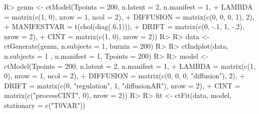\documentclass[nojss]{jss}\usepackage[]{graphicx}\usepackage[]{color}
\begin{document}

\begin{Schunk}
\begin{Sinput}
R> genm <- ctModel(Tpoints = 200, n.latent = 2, n.manifest = 1, 
+   LAMBDA = matrix(c(1, 0), nrow = 1, ncol = 2),
+   DIFFUSION = matrix(c(0, 0, 0, 1), 2),
+   MANIFESTVAR = t(chol(diag(.6,1))),
+   DRIFT = matrix(c(0, -.1, 1, -.2), nrow = 2),   
+   CINT = matrix(c(1, 0), nrow = 2))
R> 
R> data <- ctGenerate(genm, n.subjects = 1, burnin = 200)
R> 
R> ctIndplot(data, n.subjects = 1 , n.manifest = 1, Tpoints = 200)
R> 
R> model <- ctModel(Tpoints = 200, n.latent = 2, n.manifest = 1, 
+   LAMBDA = matrix(c(1, 0), nrow = 1, ncol = 2),
+   DIFFUSION = matrix(c(0, 0, 0, "diffusion"), 2),
+   DRIFT = matrix(c(0, "regulation", 1, "diffusionAR"), nrow = 2),   
+   CINT = matrix(c("processCINT", 0), nrow = 2))
R> 
R> fit <- ctFit(data, model, stationary = c("T0VAR"))
\end{Sinput}
\end{Schunk}
\end{document}
